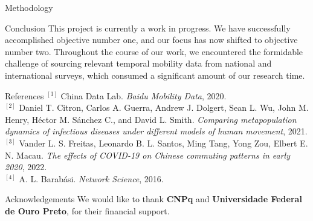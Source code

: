 \documentclass{beamer} %
\begin{document}
\begin{frame}[t]
\begin{columns}[t]
\begin{column}{0.465\textwidth}
\begin{block}{Methodology}
    
\end{block}

\begin{block}{Conclusion}
This project is currently a work in progress. We have successfully accomplished objective number one, and our focus has now shifted to objective number two. Throughout the course of our work, we encountered the formidable challenge of sourcing relevant temporal mobility data from national and international surveys, which consumed a significant amount of our research time.
\end{block}


\begin{block}{References}
    \small
	$^{[1]}$ China Data Lab. \textit{Baidu Mobility Data}, 2020. \\
    $^{[2]}$ Daniel T. Citron, Carlos A. Guerra, Andrew J. Dolgert, Sean L. Wu, John M. Henry, Héctor M. Sánchez C., and David L. Smith. \textit{Comparing metapopulation dynamics of infectious diseases under different models of human movement}, 2021. \\
    $^{[3]}$ Vander L. S. Freitas, Leonardo B. L. Santos, Ming Tang, Yong Zou, Elbert E. N. Macau. \textit{The effects of COVID-19 on Chinese commuting patterns in early 2020}, 2022. \\
    $^{[4]}$ A. L. Barabási. \textit{Network Science}, 2016.
    
    
\end{block}


\begin{block}{Acknowledgements}
We would like to thank \textbf{CNPq} and \textbf{Universidade Federal de Ouro Preto}, for their financial support.
\end{block}




\end{column}
\end{columns}
\end{frame}
\end{document}
